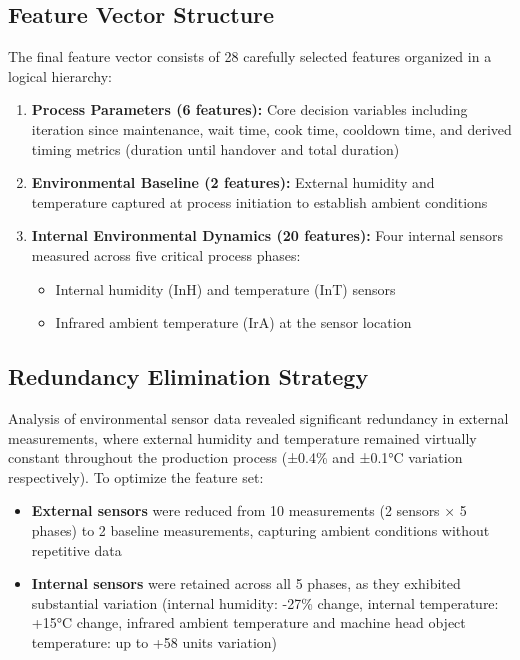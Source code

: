 \subsection{Feature Vector Structure}

The final feature vector consists of 28 carefully selected features organized in a logical hierarchy:

\begin{enumerate}
    \item \textbf{Process Parameters (6 features):} Core decision variables including iteration since maintenance, wait time, cook time, cooldown time, and derived timing metrics (duration until handover and total duration)
    \item \textbf{Environmental Baseline (2 features):} External humidity and temperature captured at process initiation to establish ambient conditions
    \item \textbf{Internal Environmental Dynamics (20 features):} Four internal sensors measured across five critical process phases:
    \begin{itemize}
        \item Internal humidity (InH) and temperature (InT) sensors
        \item Infrared ambient temperature (IrA) at the sensor location
    \end{itemize}
\end{enumerate}

\subsection{Redundancy Elimination Strategy}


Analysis of environmental sensor data revealed significant redundancy in external measurements, where external humidity and temperature remained virtually constant throughout the production process (±0.4\% and ±0.1°C variation respectively). To optimize the feature set:

\begin{itemize}
    \item \textbf{External sensors} were reduced from 10 measurements (2 sensors × 5 phases) to 2 baseline measurements, capturing ambient conditions without repetitive data
    \item \textbf{Internal sensors} were retained across all 5 phases, as they exhibited substantial variation (internal humidity: -27\% change, internal temperature: +15°C change, infrared ambient temperature and machine head object temperature: up to +58 units variation)
\end{itemize}

